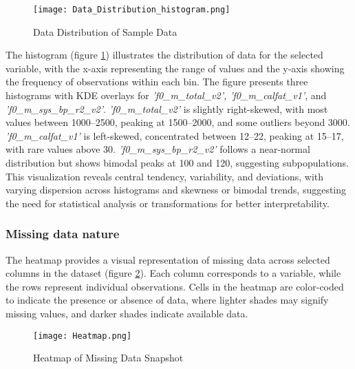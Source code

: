 \documentclass[12pt]{article}
\begin{document}

\begin{figure}[H]  %
    \centering
    \texttt{[image: Data\_Distribution\_histogram.png]} %
    \caption{Data Distribution of Sample Data}
    \label{fig:Data_distribution}
\end{figure}

The histogram (figure \ref{fig:Data_distribution}) illustrates the distribution of data for the selected variable, with the x-axis representing the range of values and the y-axis showing the frequency of observations within each bin. The figure presents three histograms with KDE overlays for \textit{'f0\_m\_total\_v2', 'f0\_m\_calfat\_v1'}, and \textit{'f0\_m\_sys\_bp\_r2\_v2'}. \textit{'f0\_m\_total\_v2'} is slightly right-skewed, with most values between 1000–2500, peaking at 1500–2000, and some outliers beyond 3000. \textit{'f0\_m\_calfat\_v1'} is left-skewed, concentrated between 12–22, peaking at 15–17, with rare values above 30. \textit{'f0\_m\_sys\_bp\_r2\_v2'} follows a near-normal distribution but shows bimodal peaks at 100 and 120, suggesting subpopulations. This visualization reveals central tendency, variability, and deviations, with varying dispersion across histograms and skewness or bimodal trends, suggesting the need for statistical analysis or transformations for better interpretability.

\subsubsection{Missing data nature}
The heatmap provides a visual representation of missing data across selected columns in the dataset (figure \ref{fig:heatmap_missing_data}). Each column corresponds to a variable, while the rows represent individual observations. Cells in the heatmap are color-coded to indicate the presence or absence of data, where lighter shades may signify missing values, and darker shades indicate available data. 



\begin{figure}[H]
    \centering
    \texttt{[image: Heatmap.png]} %
    \caption{Heatmap of Missing Data Snapshot}
    \label{fig:heatmap_missing_data}
\end{figure}
\end{document}
